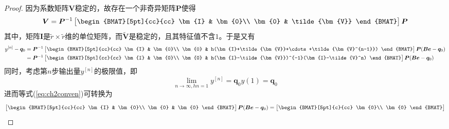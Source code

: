 \begin{proof}
因为系数矩阵$\bm{V}$稳定的，故存在一个非奇异矩阵$\bm{P}$使得
\begin{equation}
\bm{V}=\bm{P}^{-1}\begin{bmatrix}
\begin{BMAT}[5pt]{cc}{cc}
\bm{I} & \bm{0}\\
\bm{0} & \tilde{\bm{V}}
\end{BMAT}
\end{bmatrix}\bm{P}
\end{equation}
其中，矩阵$\bm{I}$是$\tilde{r}\times\tilde{r}$维的单位矩阵，而$\tilde{\bm{V}}$是稳定的，且其特征值不含$1$。于是又有\begin{equation}
\begin{aligned}
y^{[n]}-\bm{q}_0&=\bm{P}^{-1}\begin{bmatrix}
\begin{BMAT}[5pt]{cc}{cc}
\bm{I} & \bm{0}\\
\bm{0} & h(\bm{I}+\tilde{\bm{V}}+\cdots+\tilde{\bm{V}^{n-1}})
\end{BMAT}
\end{bmatrix}\bm{P}(\bm{Be}-\bm{q}_0)\\
&=\bm{P}^{-1}\begin{bmatrix}
\begin{BMAT}[5pt]{cc}{cc}
\bm{I} & \bm{0}\\
\bm{0} & h(\bm{I}-\tilde{\bm{V}})^{-1}(\bm{I}-\tilde{V}^n)
\end{BMAT}
\end{bmatrix}\bm{P}(\bm{Be}-\bm{q}_0)
\end{aligned}\label{eq:ch2conven}
\end{equation}
同时，考虑第$n$步输出量$y^{[n]}$的极限值，即
\begin{equation}
\lim_{n\to\infty,hn=1}y^{[n]}=\bm{q}_0y(1)=\bm{q}_0
\end{equation}
进而等式(\ref{eq:ch2conven})可转换为
\begin{equation}
\begin{bmatrix}
\begin{BMAT}[5pt]{cc}{cc}
\bm{I} & \bm{0}\\
\bm{0} & \bm{0}
\end{BMAT}
\end{bmatrix}\bm{P}(\bm{Be}-\bm{q}_0)=\begin{bmatrix}
\begin{BMAT}[5pt]{c}{cc}
 \bm{0}\\
\bm{0}
\end{BMAT}
\end{bmatrix}
\end{equation}

\end{proof}
